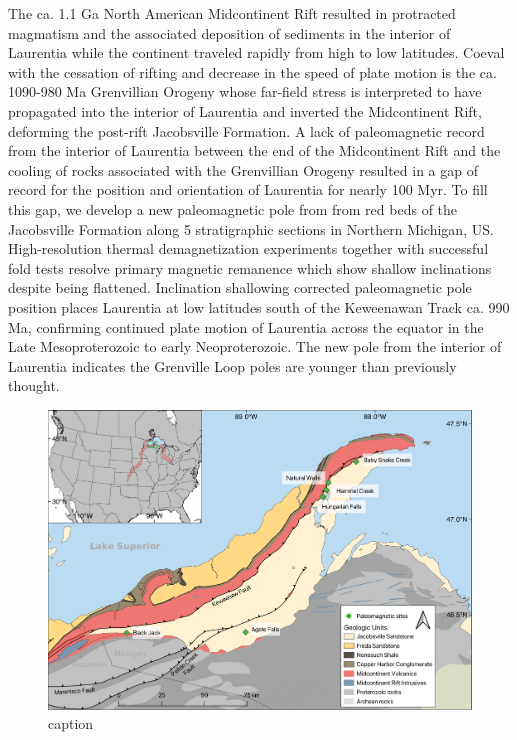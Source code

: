 \documentclass[draft]{agujournal2019}
\begin{document}
The ca. 1.1 Ga North American Midcontinent Rift resulted in protracted magmatism and the associated deposition of sediments in the interior of Laurentia while the continent traveled rapidly from high to low latitudes. Coeval with the cessation of rifting and decrease in the speed of plate motion is the ca. 1090-980 Ma Grenvillian Orogeny whose far-field stress is interpreted to have propagated into the interior of Laurentia and inverted the Midcontinent Rift, deforming the post-rift Jacobsville Formation. A lack of paleomagnetic record from the interior of Laurentia between the end of the Midcontinent Rift and the cooling of rocks associated with the Grenvillian Orogeny resulted in a gap of record for the position and orientation of Laurentia for nearly 100 Myr. To fill this gap, we develop a new paleomagnetic pole from from red beds of the Jacobsville Formation along 5 stratigraphic sections in Northern Michigan, US. High-resolution thermal demagnetization experiments together with successful fold tests resolve primary magnetic remanence which show shallow inclinations despite being  flattened. Inclination shallowing corrected paleomagnetic pole position places Laurentia at low latitudes south of the Keweenawan Track ca. 990 Ma, confirming continued plate motion of Laurentia across the equator in the Late Mesoproterozoic to early Neoproterozoic. The new pole from the interior of Laurentia indicates the Grenville Loop poles are younger than previously thought.



\begin{figure}
\noindent\includegraphics[width=\textwidth]{../Figures/Geologic_map.pdf}
\caption{caption}
\label{pngfiguresample}
\end{figure}
\end{document}
